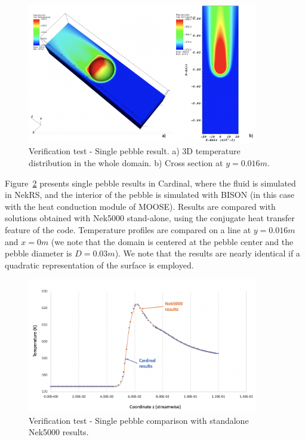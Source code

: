 \begin{figure}[!h]
\centering
\includegraphics[clip=true,width=0.9\textwidth]{Figures/nrs_vv1}
\caption{Verification test - Single pebble result. a) 3D temperature distribution in the whole domain. b) Cross section at $y=0.016 m$.}
\label{f:nrs1}
\end{figure}

Figure~\ref{f:nrs2} presents single pebble results in Cardinal,  where the fluid is simulated in NekRS, and the interior of the pebble is simulated with BISON (in this case with the heat conduction module of MOOSE). Results are compared with solutions obtained with Nek5000 stand-alone, using the conjugate heat transfer feature of the code. Temperature profiles are compared on a line at $y=0.016 m$ and $x=0 m$ (we note that the domain is centered at the pebble center and the pebble diameter is $D=0.03 m$). We note that the results are nearly identical if a quadratic representation of the surface is employed.

\begin{figure}[!h]
\centering
\includegraphics[clip=true,width=0.9\textwidth]{Figures/nrs_vv2}
\caption{Verification test - Single pebble comparison with standalone Nek5000 results. }
\label{f:nrs2}
\end{figure}

